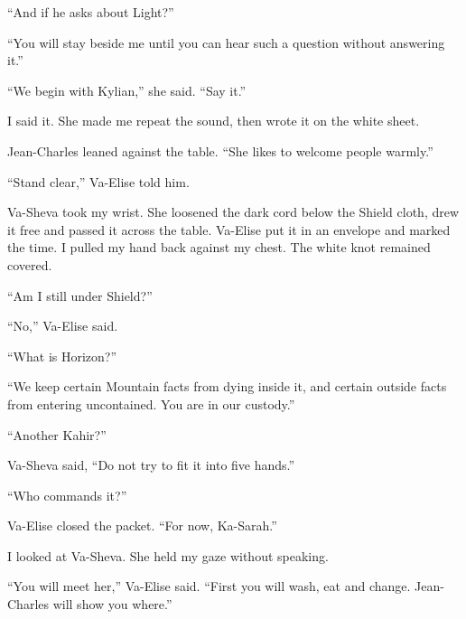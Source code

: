 ``And if he asks about Light?''\par

``You will stay beside me until you can hear such a question without answering it.''\par

``We begin with Kylian,'' she said. ``Say it.''\par

I said it. She made me repeat the sound, then wrote it on the white sheet.\par

Jean-Charles leaned against the table. ``She likes to welcome people warmly.''\par

``Stand clear,'' Va-Elise told him.\par

Va-Sheva took my wrist. She loosened the dark cord below the Shield cloth, drew it free and passed it across the table. Va-Elise put it in an envelope and marked the time. I pulled my hand back against my chest. The white knot remained covered.\par

``Am I still under Shield?''\par

``No,'' Va-Elise said.\par

``What is Horizon?''\par

``We keep certain Mountain facts from dying inside it, and certain outside facts from entering uncontained. You are in our custody.''\par

``Another Kahir?''\par

Va-Sheva said, ``Do not try to fit it into five hands.''\par

``Who commands it?''\par

Va-Elise closed the packet. ``For now, Ka-Sarah.''\par

I looked at Va-Sheva. She held my gaze without speaking.\par

``You will meet her,'' Va-Elise said. ``First you will wash, eat and change. Jean-Charles will show you where.''\par

\ornament

